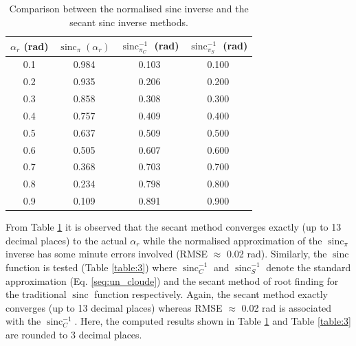 \documentclass[review]{elsarticle}
\numberwithin{equation}{section}
\numberwithin{figure}{section}
\numberwithin{table}{section}
\DeclareMathOperator{\sinc}{sinc}
\begin{document}
\begin{table}[ht]
\centering
\caption{Comparison between the normalised \cite{Cloude2010} sinc inverse and the secant sinc inverse methods.}
\label{table:2}
\begin{tabular}{c c c c}
\hline
\boldmath$\alpha_r$ \textbf{(rad)} & \boldmath$\sinc_{\pi}\left(\alpha_r\right)$   & \boldmath$\sinc_{\pi_C}^{-1}$ \textbf{(rad)}     & \boldmath$\sinc_{\pi_S}^{-1}$ \textbf{(rad)} \\ \hline
0.1                 & 0.984            & 0.103          & 0.100  \\ 
0.2                 & 0.935            & 0.206          & 0.200  \\ 
0.3                 & 0.858            & 0.308          & 0.300  \\ 
0.4                 & 0.757            & 0.409          & 0.400  \\ 
0.5                 & 0.637            & 0.509          & 0.500   \\ 
0.6                 & 0.505            & 0.607          & 0.600  \\ 
0.7                 & 0.368            & 0.703          & 0.700   \\ 
0.8                 & 0.234            & 0.798          & 0.800 \\ 
0.9                 & 0.109            & 0.891          & 0.900 \\ \hline

\end{tabular}
\end{table}

From Table \ref{table:2} it is observed that the secant method converges exactly (up to 13 decimal places) to the
actual $\alpha_r$ while the normalised \cite{Cloude2010} approximation of the $\sinc_\pi$ inverse has some minute errors
involved (RMSE $\approx$ 0.02 rad). Similarly, the $\sinc$ function is tested (Table \ref{table:3}) where $\sinc_C^{-1}$ and $\sinc_S^{-1}$ denote the standard \cite{Cloude2010} approximation (Eq. \eqref{seq:un_cloude}) and the secant method of root finding for the traditional $\sinc$ function respectively. Again, the secant method exactly converges (up to 13 decimal
places) whereas RMSE $\approx$ 0.02 rad is associated with the $\sinc_C^{-1}$. Here, the computed results shown in
Table \ref{table:2} and Table \ref{table:3} are rounded to 3 decimal places.
\end{document}
